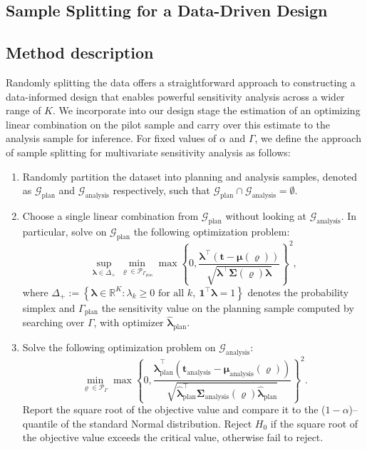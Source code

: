 \documentclass[12pt,leqno,titlepage]{amsart}
\newcommand{\G}{\mathcal{G}}
\newcommand{\1}{\mathbbm{1}}
\newcommand{\p}{\text{plan}}
\renewcommand{\a}{\text{analysis}}
\begin{document}
\begin{bibunit}
\section{Sample Splitting for a Data-Driven Design} \label{sec: splitting}

\subsection{Method description} \label{sec: ourmethod}


Randomly splitting the data offers a straightforward approach to constructing a data-informed design that enables powerful sensitivity analysis across a wider range of $K$. We incorporate into our design stage the estimation of an optimizing linear combination on the pilot sample and carry over this estimate to the analysis sample for inference. 
For fixed values of $\alpha$ and $\Gamma$, we define the approach of sample splitting for multivariate sensitivity analysis as follows:
    \begin{enumerate}[label=\textbf{Step \arabic*: }, leftmargin=*,topsep=0pt]
    \item Randomly partition the dataset into planning and analysis samples, denoted as $\mathcal{G}_{\p}$ and $\mathcal{G}_{\a}$ respectively, such that $\mathcal{G}_{\p} \cap \mathcal{G}_{\a} = \emptyset$.
    \item Choose a single linear combination from $\G_{\p}$ without looking at $\G_{\a}$. In particular, solve on $\G_{\p}$ the following optimization problem:
    \begin{equation} \label{p1}
    \sup_{\boldsymbol{\lambda} \in \Delta_+} \min_{\boldsymbol{\varrho} \in \mathcal{P}_{\Gamma_\p}} \max\left \{0,\frac{\boldsymbol{\lambda}^{\top} (\textbf{t}-\boldsymbol{\mu}(\boldsymbol{\varrho}))}{\sqrt{\boldsymbol{\lambda}^{\top} \boldsymbol{\Sigma}(\boldsymbol{\varrho})\boldsymbol{\lambda}}}\right \}^2,
    \end{equation}
    where $
\Delta_+
:=
\left\{
\boldsymbol{\lambda}\in\mathbb R^K :
\lambda_k\ge 0 \text{ for all } k,
\ \mathbf 1^\top \boldsymbol{\lambda} =1
\right\}
$
denotes the probability simplex and $\Gamma_\p$ the sensitivity value on the planning sample computed by searching over $\Gamma$, with optimizer $\widehat{\boldsymbol{\lambda}}_\p$.
    \item Solve the following optimization problem on $\G_{\a}$:
    \begin{equation} \label{p2}
    \min_{\boldsymbol{\varrho} \in \mathcal{P}_{\Gamma}} \max\left \{0,\frac{\widehat{\boldsymbol{\lambda}}_\p^{\top} (\textbf{t}_\a-\boldsymbol{\mu}_\a(\boldsymbol{\varrho}))}{\sqrt{\widehat{\boldsymbol{\lambda}}_\p^{\top} \boldsymbol{\Sigma}_\a(\boldsymbol{\varrho})\widehat{\boldsymbol{\lambda}}_\p}}\right \}^2.
    \end{equation}
    Report the square root of the objective value and compare it to the ($1-\alpha$)--quantile of the standard Normal distribution. Reject $H_0$ if the square root of the objective value exceeds the critical value, otherwise fail to reject.
    \end{enumerate}
    

\end{bibunit}
\end{document}
